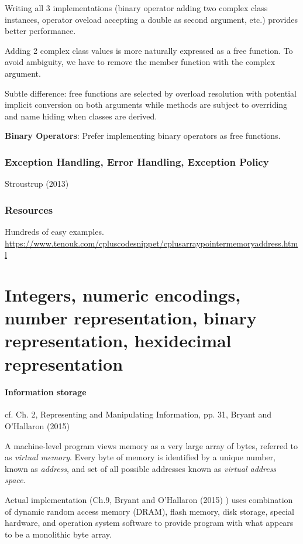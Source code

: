 \documentclass[10pt]{amsart}
\begin{document}
Writing all 3 implementations (binary operator adding two complex class instances, operator oveload accepting a double as second argument, etc.) provides better performance.

Adding 2 complex class values is more naturally expressed as a free function. To avoid ambiguity, we have to remove the member function with the complex argument.

Subtle difference: free functions are selected by overload resolution with potential implicit conversion on both arguments while methods are subject to overriding and name hiding when classes are derived.

\textbf{Binary Operators}: Prefer implementing binary operators as free functions.


\section{Exception Handling, Error Handling, Exception Policy}

Stroustrup (2013) \cite{Stro2013}

\section{Resources}

Hundreds of easy examples.
\url{https://www.tenouk.com/cpluscodesnippet/cplusarraypointermemoryaddress.html}

\part{Integers, numeric encodings, number representation, binary representation, hexidecimal representation}

\subsection{Information storage}

cf. Ch. 2, Representing and Manipulating Information, pp. 31, Bryant and O'Hallaron (2015) \cite{BrOH2016}

A machine-level program views memory as a very large array of bytes, referred to as \emph{virtual memory}. Every byte of memory is identified by a unique number, known as \emph{address}, and set of all possible addresses known as \emph{virtual address space}. 

Actual implementation (Ch.9, Bryant and O'Hallaron (2015) \cite{BrOH2016}) uses combination of dynamic random access memory (DRAM), flash memory, disk storage, special hardware, and operation system software to provide program with what appears to be a monolithic byte array.
\end{document}
